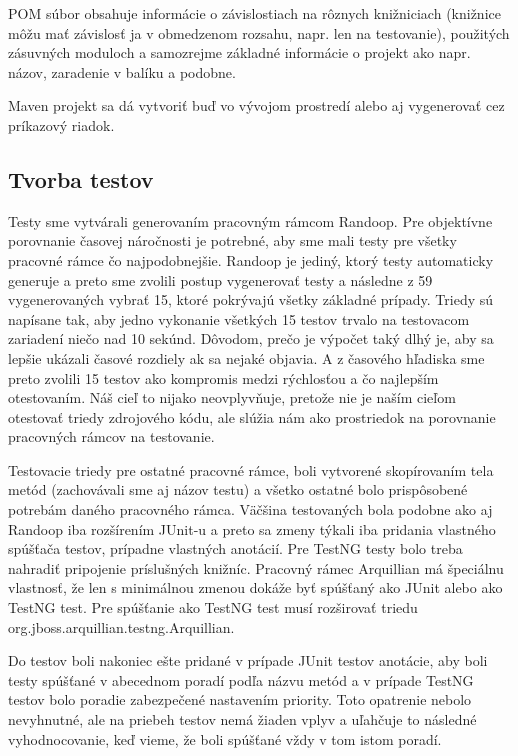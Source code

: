 \documentclass[11pt,twoside,slovak,a4paper]{article}
\begin{document}
	POM súbor obsahuje informácie o závislostiach na rôznych knižniciach (knižnice môžu mať závislosť ja v obmedzenom rozsahu, napr. len na testovanie), použitých zásuvných moduloch a samozrejme základné informácie o projekt ako napr. názov, zaradenie v balíku a podobne.
	
	Maven projekt sa dá vytvoriť buď vo vývojom prostredí alebo aj vygenerovať cez príkazový riadok.
	
	\subsection{Tvorba testov}
	
	Testy sme vytvárali generovaním pracovným rámcom Randoop. Pre objektívne porovnanie časovej náročnosti je potrebné, aby sme mali testy pre všetky pracovné rámce čo najpodobnejšie. Randoop je jediný, ktorý testy automaticky generuje a preto sme zvolili postup vygenerovať testy a následne z 59 vygenerovaných vybrať 15, ktoré pokrývajú všetky základné prípady. Triedy sú napísane tak, aby jedno vykonanie všetkých 15 testov trvalo na testovacom zariadení niečo nad 10 sekúnd. Dôvodom, prečo je výpočet taký dlhý je, aby sa lepšie ukázali časové rozdiely ak sa nejaké objavia. A z časového hľadiska sme preto zvolili 15 testov ako kompromis medzi rýchlosťou a čo najlepším otestovaním. Náš cieľ to nijako neovplyvňuje, pretože nie je naším cieľom otestovať triedy zdrojového kódu, ale slúžia nám ako prostriedok na porovnanie pracovných rámcov na testovanie.
	
	Testovacie triedy pre ostatné pracovné rámce, boli vytvorené skopírovaním tela metód (zachovávali sme aj názov testu) a všetko ostatné bolo prispôsobené potrebám daného pracovného rámca. Väčšina testovaných bola podobne ako aj Randoop iba rozšírením JUnit-u a preto sa zmeny týkali iba pridania vlastného spúšťača testov, prípadne vlastných anotácií. Pre TestNG testy bolo treba nahradiť pripojenie príslušných knižníc. Pracovný rámec Arquillian má špeciálnu vlastnosť, že len s minimálnou zmenou dokáže byť spúšťaný ako JUnit alebo ako TestNG test. Pre spúšťanie ako TestNG test musí rozširovať triedu org.jboss.arquillian.testng.Arquillian.
	
	Do testov boli nakoniec ešte pridané v prípade JUnit testov anotácie, aby boli testy spúšťané v abecednom poradí podľa názvu metód a v prípade TestNG testov bolo poradie zabezpečené nastavením priority. Toto opatrenie nebolo nevyhnutné, ale na priebeh testov nemá žiaden vplyv a uľahčuje to následné vyhodnocovanie, keď vieme, že boli spúšťané vždy v tom istom poradí.
	
\end{document}

